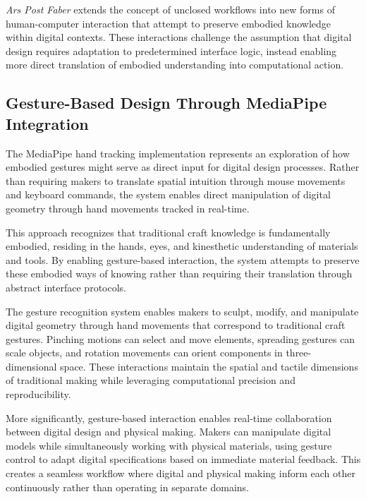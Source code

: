 \textit{Ars Post Faber} extends the concept of unclosed workflows into new forms of human-computer interaction that attempt to preserve embodied knowledge within digital contexts. These interactions challenge the assumption that digital design requires adaptation to predetermined interface logic, instead enabling more direct translation of embodied understanding into computational action.

\subsection{Gesture-Based Design Through MediaPipe Integration}

The MediaPipe hand tracking implementation represents an exploration of how embodied gestures might serve as direct input for digital design processes. Rather than requiring makers to translate spatial intuition through mouse movements and keyboard commands, the system enables direct manipulation of digital geometry through hand movements tracked in real-time.

\vspace{0.5cm}

This approach recognizes that traditional craft knowledge is fundamentally embodied, residing in the hands, eyes, and kinesthetic understanding of materials and tools. By enabling gesture-based interaction, the system attempts to preserve these embodied ways of knowing rather than requiring their translation through abstract interface protocols.

\vspace{0.5cm}

The gesture recognition system enables makers to sculpt, modify, and manipulate digital geometry through hand movements that correspond to traditional craft gestures. Pinching motions can select and move elements, spreading gestures can scale objects, and rotation movements can orient components in three-dimensional space. These interactions maintain the spatial and tactile dimensions of traditional making while leveraging computational precision and reproducibility.

\vspace{0.5cm}

More significantly, gesture-based interaction enables real-time collaboration between digital design and physical making. Makers can manipulate digital models while simultaneously working with physical materials, using gesture control to adapt digital specifications based on immediate material feedback. This creates a seamless workflow where digital and physical making inform each other continuously rather than operating in separate domains.

